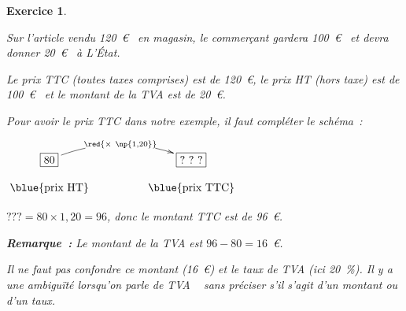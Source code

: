 \documentclass[10pt]{article}
\newtheorem{exo}{Exercice}
\begin{document}
\begin{exo}
\begin{enumerate}
Sur l'article vendu 120~\euro~{} en magasin, le commerçant gardera 100~\euro~{} et devra donner 20~\euro~{} à L’État.

Le prix TTC (toutes taxes comprises) est de 120~\euro, le prix HT (hors taxe) est de 100~\euro~{} et le montant de la TVA est de 20~\euro.

\medskip

Pour avoir le prix TTC dans notre exemple, il faut compléter le schéma~:



\begin{center}
$\xymatrix@R=0.5pc@C=4pc{
    *+[F]+\txt{80} \ar@/^0.5cm/[r]|{\red{\times ~\np{1,20}}} & 
    *+[F]+\txt{?~?~?}  \\
    \txt{\blue{prix HT}}&
    \txt{\blue{prix TTC}}}$
    
    \end{center}
    
    \medskip
    
 $???=80\times 1,20=96$, donc le montant TTC est de 96~\euro.
 
 \medskip
 
 \textbf{Remarque~:} Le montant de la TVA est $96-80=16$~\euro.
 
 Il ne faut pas confondre ce montant (16~\euro) et le taux de TVA (ici 20~\%). Il y a une ambiguïté lorsqu'on parle de \og TVA \fg~{} sans préciser s'il s'agit d'un montant ou d'un taux.
\end{enumerate}

\end{exo}
\end{document}
